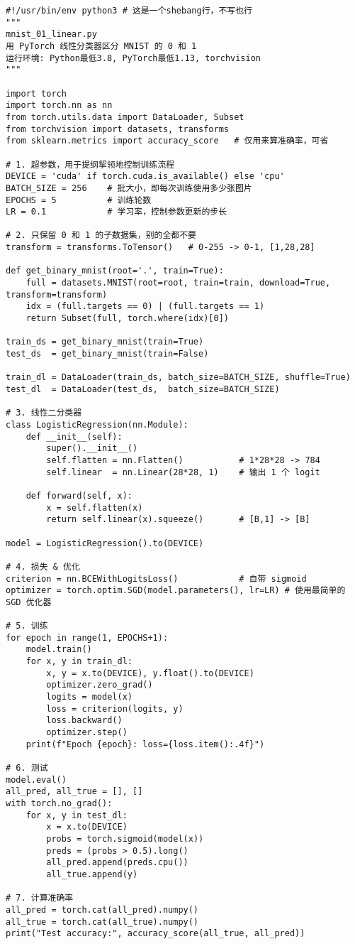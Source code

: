 \documentclass[../main.tex]{subfiles}
\begin{document}
\begin{lstlisting}
#!/usr/bin/env python3 # 这是一个shebang行，不写也行
"""
mnist_01_linear.py
用 PyTorch 线性分类器区分 MNIST 的 0 和 1
运行环境: Python最低3.8, PyTorch最低1.13, torchvision
"""

import torch
import torch.nn as nn
from torch.utils.data import DataLoader, Subset
from torchvision import datasets, transforms
from sklearn.metrics import accuracy_score   # 仅用来算准确率，可省

# 1. 超参数，用于提纲挈领地控制训练流程
DEVICE = 'cuda' if torch.cuda.is_available() else 'cpu'
BATCH_SIZE = 256    # 批大小，即每次训练使用多少张图片
EPOCHS = 5          # 训练轮数
LR = 0.1            # 学习率，控制参数更新的步长

# 2. 只保留 0 和 1 的子数据集，别的全都不要
transform = transforms.ToTensor()   # 0-255 -> 0-1, [1,28,28]

def get_binary_mnist(root='.', train=True):
    full = datasets.MNIST(root=root, train=train, download=True, transform=transform)
    idx = (full.targets == 0) | (full.targets == 1)
    return Subset(full, torch.where(idx)[0])

train_ds = get_binary_mnist(train=True)
test_ds  = get_binary_mnist(train=False)

train_dl = DataLoader(train_ds, batch_size=BATCH_SIZE, shuffle=True)
test_dl  = DataLoader(test_ds,  batch_size=BATCH_SIZE)

# 3. 线性二分类器
class LogisticRegression(nn.Module):
    def __init__(self):
        super().__init__()
        self.flatten = nn.Flatten()           # 1*28*28 -> 784
        self.linear  = nn.Linear(28*28, 1)    # 输出 1 个 logit

    def forward(self, x):
        x = self.flatten(x)
        return self.linear(x).squeeze()       # [B,1] -> [B]

model = LogisticRegression().to(DEVICE)

# 4. 损失 & 优化
criterion = nn.BCEWithLogitsLoss()            # 自带 sigmoid
optimizer = torch.optim.SGD(model.parameters(), lr=LR) # 使用最简单的 SGD 优化器

# 5. 训练
for epoch in range(1, EPOCHS+1):
    model.train()
    for x, y in train_dl:
        x, y = x.to(DEVICE), y.float().to(DEVICE)
        optimizer.zero_grad()
        logits = model(x)
        loss = criterion(logits, y)
        loss.backward()
        optimizer.step()
    print(f"Epoch {epoch}: loss={loss.item():.4f}")

# 6. 测试
model.eval()
all_pred, all_true = [], []
with torch.no_grad():
    for x, y in test_dl:
        x = x.to(DEVICE)
        probs = torch.sigmoid(model(x))
        preds = (probs > 0.5).long()
        all_pred.append(preds.cpu())
        all_true.append(y)

# 7. 计算准确率
all_pred = torch.cat(all_pred).numpy()
all_true = torch.cat(all_true).numpy()
print("Test accuracy:", accuracy_score(all_true, all_pred))
\end{lstlisting}
\end{document}

